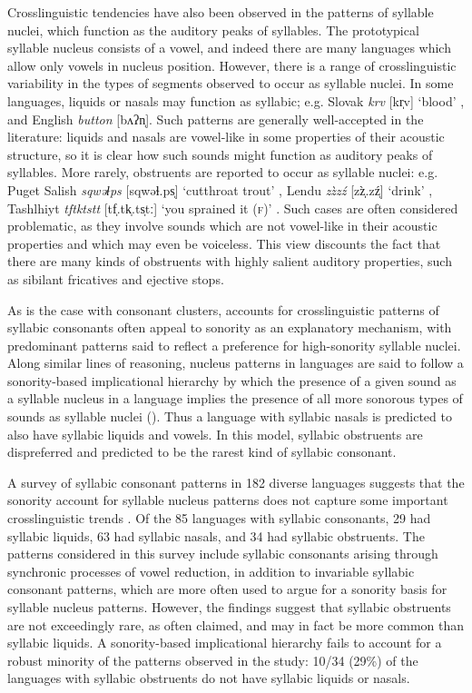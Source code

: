   Crosslinguistic tendencies have also been observed in the patterns of syllable nuclei, which function as the auditory peaks of syllables. The prototypical syllable nucleus consists of a vowel, and indeed there are many languages which allow only vowels in nucleus position. However, there is a range of crosslinguistic variability in the types of segments observed to occur as syllable nuclei. In some languages, liquids or nasals may function as syllabic; e.g. Slovak \textit{krv} [kr̩v] ‘blood’ \citep[186]{Zec2007}, and English \textit{button} [bʌʔn̩]. Such patterns are generally well-accepted in the literature: liquids and nasals are vowel-like in some properties of their acoustic structure, so it is clear how such sounds might function as auditory peaks of syllables. More rarely, obstruents are reported to occur as syllable nuclei: e.g. Puget Salish \textit{sqwəɬps} [sqwəɬ.ps̩] ‘cutthroat trout’ \citep[62]{Hoard1978}, Lendu \textit{zz̀zź} [z\`z̩.zź̩] ‘drink’ \citep[483]{Demolin2002}, Tashlhiyt \textit{tftktstt} [tf̩.tk̩.ts̩tː] ‘you sprained it (\textsc{f})’ \citep[332]{Ridouane2008}. Such cases are often considered problematic, as they involve sounds which are not vowel-like in their acoustic properties and which may even be voiceless. This view discounts the fact that there are many kinds of obstruents with highly salient auditory properties, such as sibilant fricatives and ejective stops.

  As is the case with consonant clusters, accounts for crosslinguistic patterns of syllabic consonants often appeal to sonority as an explanatory mechanism, with predominant patterns said to reflect a preference for high-sonority syllable nuclei. Along similar lines of reasoning, nucleus patterns in languages are said to follow a sonority-based implicational hierarchy by which the presence of a given sound as a syllable nucleus in a language implies the presence of all more sonorous types of sounds as syllable nuclei (\citealt{Blevins1995,Zec2007}). Thus a language with syllabic nasals is predicted to also have syllabic liquids and vowels. In this model, syllabic obstruents are dispreferred and predicted to be the rarest kind of syllabic consonant.

  A survey of syllabic consonant patterns in 182 diverse languages suggests that the sonority account for syllable nucleus patterns does not capture some important crosslinguistic trends \citep{Bell1978a}. Of the 85 languages with syllabic consonants, 29 had syllabic liquids, 63 had syllabic nasals, and 34 had syllabic obstruents. The patterns considered in this survey include syllabic consonants arising through synchronic processes of vowel reduction, in addition to invariable syllabic consonant patterns, which are more often used to argue for a sonority basis for syllable nucleus patterns. However, the findings suggest that syllabic obstruents are not exceedingly rare, as often claimed, and may in fact be more common than syllabic liquids. A sonority-based implicational hierarchy fails to  account for a robust minority of the patterns observed in the study: 10/34 (29\%) of the languages with syllabic obstruents do not have syllabic liquids or nasals.


